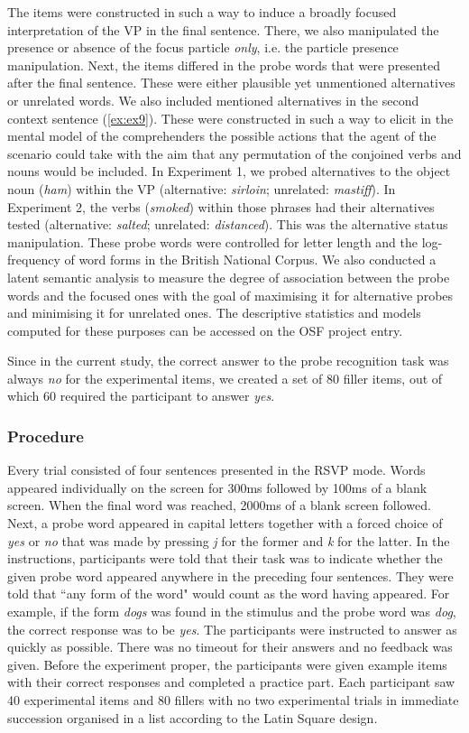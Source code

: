 \documentclass[output=paper,colorlinks,citecolor=brown]{langscibook}
\begin{document}
The items were constructed in such a way to induce a broadly focused interpretation of the VP in the final sentence. There, we also manipulated the presence or absence of the focus particle \textit{only}, i.e. the particle presence manipulation. Next, the items differed in the probe words that were presented after the final sentence. These were either plausible yet unmentioned alternatives or unrelated words. We also included mentioned alternatives in the second context sentence (\ref{ex:ex9}). These were constructed in such a way to elicit in the mental model of the comprehenders the possible actions that the agent of the scenario could take with the aim that any permutation of the conjoined verbs and nouns would be included. In Experiment 1, we probed alternatives to the object noun (\textit{ham}) within the VP (alternative: \textit{sirloin}; unrelated: \textit{mastiff}). In Experiment 2, the verbs (\textit{smoked}) within those phrases had their alternatives tested (alternative: \textit{salted}; unrelated: \textit{distanced}). This was the alternative status manipulation. These probe words were controlled for letter length and the log-frequency of word forms in the British National Corpus. We also conducted a latent semantic analysis \citep{landauer1997latent} to measure the degree of association between the probe words and the focused ones with the goal of maximising it for alternative probes and minimising it for unrelated ones. The descriptive statistics and models computed for these purposes can be accessed on the OSF project entry. 

Since in the current study, the correct answer to the probe recognition task was always \textit{no} for the experimental items, we created a set of 80 filler items, out of which 60 required the participant to answer \textit{yes}.

\subsubsection{Procedure}

Every trial consisted of four sentences presented in the RSVP mode. Words appeared individually on the screen for 300ms followed by 100ms of a blank screen. When the final word was reached, 2000ms of a blank screen followed. Next, a probe word appeared in capital letters together with a forced choice of \textit{yes} or \textit{no} that was made by pressing \textit{j} for the former and \textit{k} for the latter. In the instructions, participants were told that their task was to indicate whether the given probe word appeared anywhere in the preceding four sentences. They were told that ``any form of the word" would count as the word having appeared. For example, if the form \textit{dogs} was found in the stimulus and the probe word was \textit{dog}, the correct response was to be \textit{yes}. The participants were instructed to answer as quickly as possible. There was no timeout for their answers and no feedback was given. Before the experiment proper, the participants were given example items with their correct responses and completed a practice part. Each participant saw 40 experimental items and 80 fillers with no two experimental trials in immediate succession organised in a list according to the Latin Square design.
\end{document}
